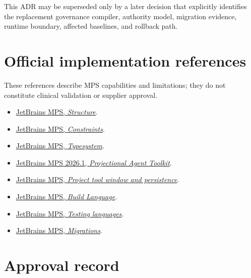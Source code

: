 \documentclass[11pt,letterpaper]{article}
\begin{document}
This ADR may be superseded only by a later decision that explicitly identifies the replacement governance compiler, authority model, migration evidence, runtime boundary, affected baselines, and rollback path.

\section{Official implementation references}

These references describe MPS capabilities and limitations; they do not constitute clinical validation or supplier approval.

\begin{itemize}
\item \href{https://www.jetbrains.com/help/mps/structure.html}{JetBrains MPS, \emph{Structure}}.
\item \href{https://www.jetbrains.com/help/mps/constraints.html}{JetBrains MPS, \emph{Constraints}}.
\item \href{https://www.jetbrains.com/help/mps/typesystem.html}{JetBrains MPS, \emph{Typesystem}}.
\item \href{https://www.jetbrains.com/help/mps/mps-projectional-agent-toolkit.html}{JetBrains MPS 2026.1, \emph{Projectional Agent Toolkit}}.
\item \href{https://www.jetbrains.com/help/mps/project-tool-window.html}{JetBrains MPS, \emph{Project tool window and persistence}}.
\item \href{https://www.jetbrains.com/help/mps/build-language.html}{JetBrains MPS, \emph{Build Language}}.
\item \href{https://www.jetbrains.com/help/mps/testing-languages.html}{JetBrains MPS, \emph{Testing languages}}.
\item \href{https://www.jetbrains.com/help/mps/migrations.html}{JetBrains MPS, \emph{Migrations}}.
\end{itemize}

{}
\section*{Approval record}
\end{document}

